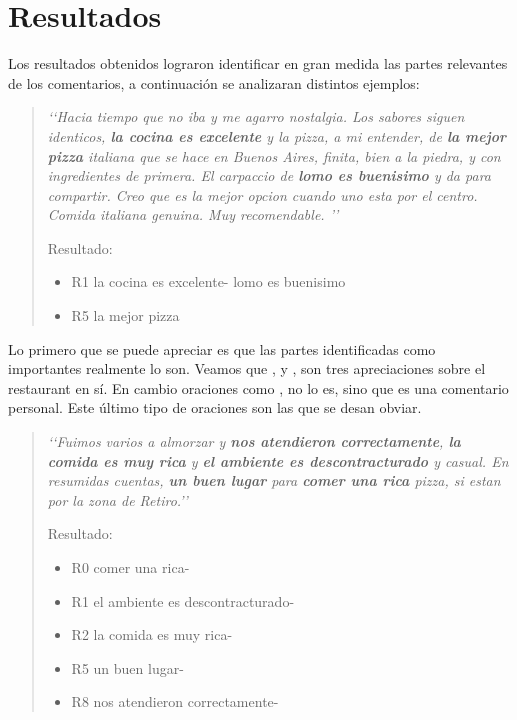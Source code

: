 \section{Resultados}

Los resultados obtenidos lograron identificar en gran medida las partes relevantes de los comentarios, a continuación se analizaran distintos ejemplos:

\begin{quotation}

\emph{
\lq{}\lq{}Hacia tiempo que no iba y me agarro nostalgia.  Los sabores siguen identicos, {\bf la cocina es excelente} y la pizza, a mi entender, de {\bf la mejor pizza} italiana que se hace en Buenos Aires, finita, bien a la piedra, y con ingredientes de primera.  El carpaccio de {\bf lomo es buenisimo} y da para compartir.  Creo que es la mejor opcion cuando uno esta por el centro.  Comida italiana genuina.  Muy recomendable. \rq{}\rq{}
}

Resultado:
\begin{itemize}
\item R1  la cocina es excelente- lomo es buenisimo
\item R5  la mejor pizza
\end{itemize}

\end{quotation}

Lo primero que se puede apreciar es que las partes identificadas como importantes realmente lo son. Veamos que ,  y , son tres apreciaciones sobre el restaurant en sí. En cambio oraciones como , no lo es, sino que es una comentario personal. Este último tipo de oraciones son las que se desan obviar.

\begin{quotation}

\emph{
\lq{}\lq{}Fuimos varios a almorzar y {\bf nos atendieron correctamente}, {\bf la comida es muy rica} y {\bf el ambiente es descontracturado} y casual.  En resumidas cuentas, {\bf un buen lugar} para {\bf comer una rica} pizza, si estan por la zona de Retiro.\rq{}\rq{}
}


Resultado:
\begin{itemize}
\item R0  comer una rica-
\item R1  el ambiente es descontracturado-
\item R2  la comida es muy rica-
\item R5  un buen lugar-
\item R8  nos atendieron correctamente-
\end{itemize}

\end{quotation}

